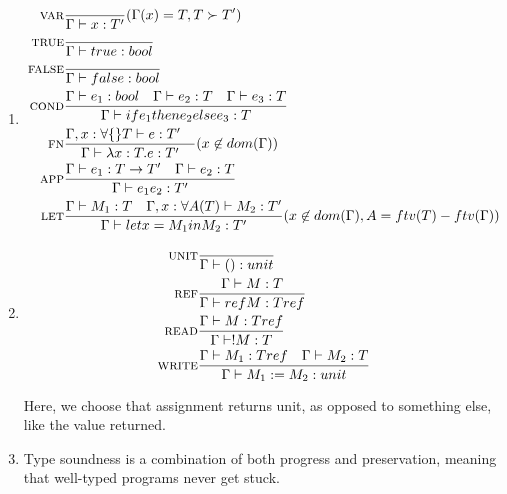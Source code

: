 


\begin{enumerate}[label=(\alph*)]
  \item

    \begin{align*}
      \textsc{var}&\frac{}{\Gamma \vdash x : T'} (\Gamma(x) = T, T \succ T')\\
      \textsc{true}&\frac{}{\Gamma \vdash true : bool}\\
      \textsc{false}&\frac{}{\Gamma \vdash false : bool}\\
      \textsc{cond}&\frac{\Gamma \vdash e_1 : bool \hspace{10pt} \Gamma \vdash e_2 : T \hspace{10pt} \Gamma \vdash e_3 : T}{\Gamma \vdash if e_1 then e_2 else e_3 : T}\\
      \textsc{fn}&\frac{\Gamma, x : \forall \{\}T \vdash e : T' \hspace{10pt}}{\Gamma \vdash \lambda x : T. e : T'}( x \not \in dom(\Gamma))\\
      \textsc{app}&\frac{\Gamma \vdash e_1 : T \rightarrow T' \hspace{10pt} \Gamma \vdash e_2 : T}{\Gamma \vdash e_1 e_2 : T'}\\
      \textsc{let}&\frac{\Gamma \vdash M_1 : T \hspace{10pt} \Gamma, x : \forall A(T) \vdash M_2 : T'}{\Gamma \vdash let x=M_1 in M_2 : T'}(x \not \in dom(\Gamma), A = ftv(T) - ftv(\Gamma))
    \end{align*}

  \item
    \begin{align*}
      \textsc{unit}&\frac{}{\Gamma \vdash () : unit}\\
      \textsc{ref}&\frac{\Gamma \vdash M : T}{\Gamma \vdash ref M : T ref}\\
      \textsc{read}&\frac{\Gamma \vdash  M : T ref}{\Gamma \vdash !M : T}\\
      \textsc{write}&\frac{\Gamma \vdash M_1 : T ref \hspace{10pt} \Gamma \vdash M_2 : T}{\Gamma \vdash M_1 := M_2 : unit}
    \end{align*}

    Here, we choose that assignment returns unit, as opposed to something else, like the value returned.

  \item

    Type soundness is a combination of both progress and preservation, meaning that well-typed programs never get stuck.


\end{enumerate}

